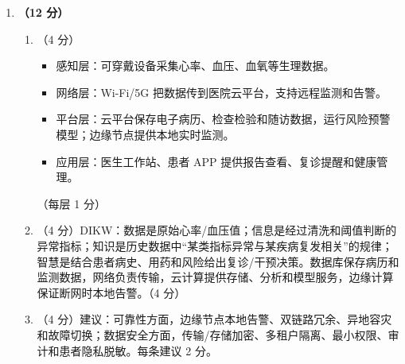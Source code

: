 \documentclass[a4paper,11pt]{article}
\begin{document}
\begin{enumerate}[start=29, label=\textbf{\arabic*.}, leftmargin=2.4em, itemsep=0.55em]
\item \textbf{（12 分）}
\begin{enumerate}[label=（\arabic*）, leftmargin=2.2em, itemsep=2pt]
  \item （4 分）
  \begin{itemize}[leftmargin=1.8em, itemsep=1pt]
    \item 感知层：可穿戴设备采集心率、血压、血氧等生理数据。
    \item 网络层：Wi-Fi/5G 把数据传到医院云平台，支持远程监测和告警。
    \item 平台层：云平台保存电子病历、检查检验和随访数据，运行风险预警模型；边缘节点提供本地实时监测。
    \item 应用层：医生工作站、患者 APP 提供报告查看、复诊提醒和健康管理。
  \end{itemize}
  \hfill（每层 1 分）
  \item （4 分）DIKW：数据是原始心率/血压值；信息是经过清洗和阈值判断的异常指标；知识是历史数据中“某类指标异常与某疾病复发相关”的规律；智慧是结合患者病史、用药和风险给出复诊/干预决策。数据库保存病历和监测数据，网络负责传输，云计算提供存储、分析和模型服务，边缘计算保证断网时本地告警。\hfill（4 分）
  \item （4 分）建议：可靠性方面，边缘节点本地告警、双链路冗余、异地容灾和故障切换；数据安全方面，传输/存储加密、多租户隔离、最小权限、审计和患者隐私脱敏。每条建议 2 分。
\end{enumerate}

\end{enumerate}
\end{document}
